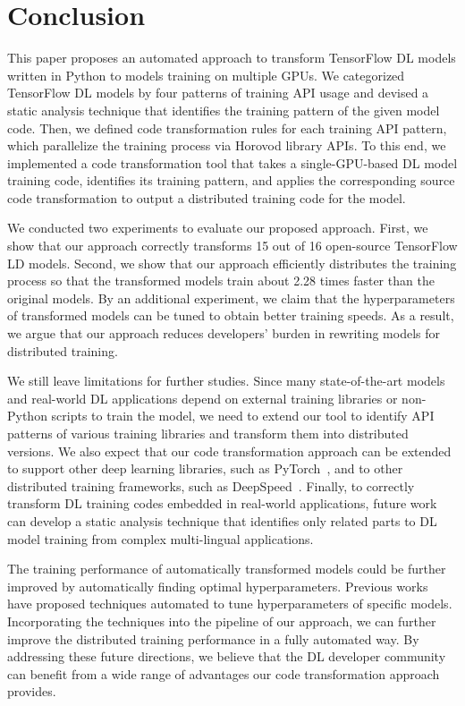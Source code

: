 \section{Conclusion}\label{sec:conclusion}
This paper proposes an automated approach to transform TensorFlow DL models
written in Python to models training on multiple GPUs.
We categorized TensorFlow DL models by four patterns of training API usage and
devised a static analysis technique that identifies the training pattern of the
given model code.
Then, we defined code transformation rules for each training API pattern, which
parallelize the training process via Horovod library APIs.
To this end, we implemented a code transformation tool
that takes a single-GPU-based DL model training code,
identifies its training pattern, and applies the corresponding source code
transformation to output a distributed training code for the model.

We conducted two experiments to evaluate our proposed approach.
First, we show that our approach correctly transforms 15 out of 16
open-source TensorFlow LD models.
Second, we show that our approach efficiently distributes the training process
so that the transformed models train about 2.28 times faster than the original
models.
By an additional experiment,
we claim that the hyperparameters of transformed models can be tuned to obtain
better training speeds.
As a result, we argue that our approach reduces developers' burden in rewriting
models for distributed training.

We still leave limitations for further studies. 
Since many state-of-the-art models and real-world DL applications depend on
external training libraries or non-Python scripts to train the model, we need
to extend our tool to identify API patterns of various training libraries and
transform them into distributed versions. 
We also expect that our code transformation approach can be extended to support
other deep learning libraries, such as PyTorch~\cite{pytorch2019}, and to other
distributed training frameworks, such as DeepSpeed~\cite{deepspeed}. 
Finally, to correctly transform DL training codes embedded in real-world
applications, future work can develop a static analysis technique that
identifies only related parts to DL model training from complex multi-lingual
applications.

The training performance of automatically transformed models could be further
improved by automatically finding optimal hyperparameters.
Previous works~\cite{pmlr-v33-yogatama14}\cite{autohyper-rl}\cite{autotune}
have proposed techniques automated to tune hyperparameters of specific models.
Incorporating the techniques into the pipeline of our approach, we can further
improve the distributed training performance in a fully automated way.
By addressing these future directions, we believe that the DL developer
community can benefit from a wide range of advantages our code
transformation approach provides.


